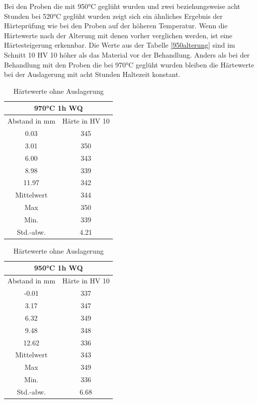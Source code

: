 \documentclass[a4paper, 11pt]{tubsreprt}
\begin{document}
Bei den Proben die mit 950°C geglüht wurden und zwei beziehungsweise acht Stunden bei 520°C geglüht wurden zeigt sich ein ähnliches Ergebnis der Härteprüfung wie bei den Proben auf der höheren Temperatur. Wenn die Härtewerte nach der Alterung mit denen vorher verglichen werden, ist eine Härtesteigerung erkennbar. Die Werte aus der Tabelle \ref{950alterung} sind im Schnitt 10 HV 10 höher als das Material vor der Behandlung. Anders als bei der Behandlung mit den Proben die bei 970°C geglüht wurden bleiben die Härtewerte bei der Auslagerung mit acht Stunden Haltezeit konstant. 
\begin{table}[t]	%
\begin{tabular}{c|c}
\multicolumn{2}{c}{970°C 1h WQ} \\
\hline 
Abstand in mm	& Härte in HV 10 \\
0.03	& 345\\
3.01	& 350\\
6.00	& 343\\
8.98	& 339 \\
11.97	& 342\\
Mittelwert	& 344 \\
Max	& 350 \\
Min.	& 339 \\
Std.-abw. &	4.21 \\

\end{tabular}
\begin{tabular}{c|c}
\multicolumn{2}{c}{950°C 1h WQ} \\
\hline 	
Abstand in mm	& 	Härte in HV 10 \\
-0.01	&	337 \\
3.17	&	347 \\
6.32	&	349 \\
9.48	&	348 \\ 
12.62	&	336 \\
Mittelwert &	343 \\
Max	&	349 \\
Min.	&	336 \\
Std.-abw.	&	6.68 \\

\end{tabular}
\caption{Härtewerte ohne Auslagerung}
\label{Hearte ohne Behandlung}
\end{table}
\end{document}
